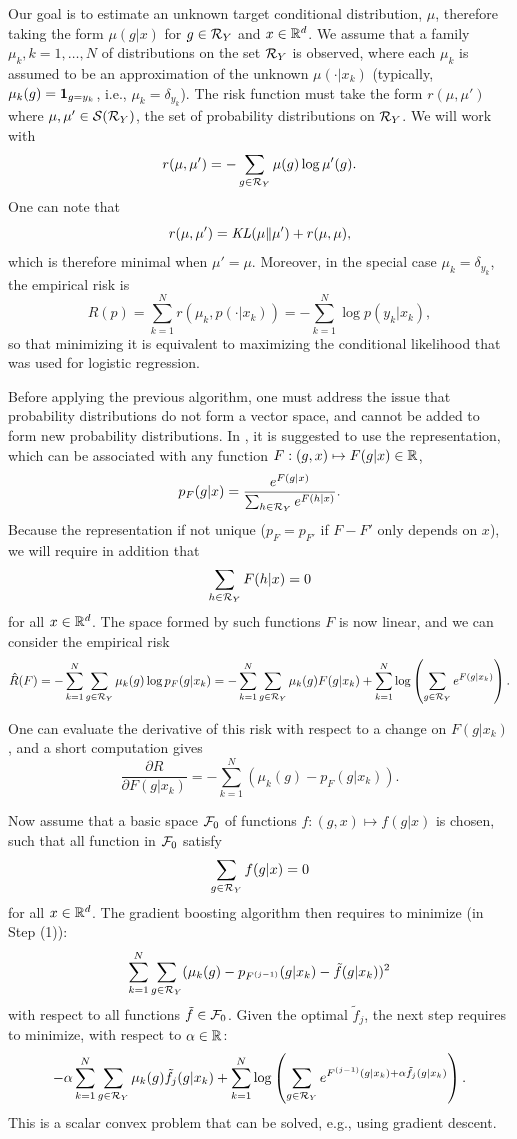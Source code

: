 Our goal is to estimate an unknown target conditional distribution, $\mu$, therefore taking the form $\mu(g|x)$ for $g\in {\mathcal R}_Y$ and $x\in{\mathbb{R}}^d$. We assume that a family $\mu_k, k=1, \ldots, N$ of distributions on the set ${\mathcal R}_Y$ is observed, where each $\mu_k$ is assumed to be an approximation of the unknown $\mu(\cdot|x_k)$ (typically, $\mu_k(g) = {\bm 1}_{g=y_k}$, i.e., $\mu_k = \delta_{y_k}$). The risk function must  take the form $r(\mu, \mu')$ where $\mu, \mu'\in {\mathcal S}({\mathcal R}_Y)$, the set of probability distributions on ${\mathcal R}_Y$. We will work with 
\[
r(\mu, \mu') = - \sum_{g\in{\mathcal R}_Y} \mu(g) \log\mu'(g).
\]
One can note that 
\[
r(\mu, \mu') = \mathit{KL}(\mu\|\mu') + r(\mu, \mu),
\]
which is therefore minimal when $\mu'=\mu$.
Moreover, in the special case $\mu_k = \delta_{y_k}$, the empirical risk is 
\[
\hat R(p) = \sum_{k=1}^N r(\mu_k, p(\cdot|x_k)) = - \sum_{k=1}^N \log p(y_k|x_k),
\]
so that minimizing it is equivalent to maximizing the conditional likelihood that was used for  logistic regression.

Before applying the previous algorithm, one must address the issue that probability distributions do not form a vector space, and cannot be added to form new probability distributions. In \citet{friedman2001greedy,htf03}, it is suggested to use the representation, which can be associated with any function $F: (g,x) \mapsto F(g|x)\in {\mathbb{R}}$,
\[
p_F(g|x) = \frac{e^{F(g|x)}}{\sum_{h\in{\mathcal R}_Y} e^{F(h|x)}}.
\]
Because the representation if not unique ($p_F = p_{F'}$ if $F-F'$ only depends on $x$), we will require in addition that
\[
\sum_{h\in{\mathcal R}_Y} F(h|x) = 0
\]
for all $x\in {\mathbb{R}}^d$. The space formed by such functions $F$ is now linear, and we can consider the empirical risk
\[
\hat R(F) = -\sum_{k=1}^N \sum_{g\in {\mathcal R}_Y} \mu_k(g)\log p_F(g|x_k) = -\sum_{k=1}^N \sum_{g\in {\mathcal R}_Y} \mu_k(g)F(g|x_k) + \sum_{k=1}^N \log\left(\sum_{g\in {\mathcal R}_Y}  e^{F(g|x_k)}\right).
\]

One can evaluate the derivative of this risk with respect to a change on $F(g|x_k)$, and a short computation gives
\[
\frac{\partial R}{\partial F(g|x_k)} = - \sum_{k=1}^N (\mu_k(g) - p_F(g|x_k)).
\]

\bigskip

Now assume that a basic space ${\mathcal F}_0$ of functions $f: (g,x) \mapsto f(g|x)$ is chosen, such that all function in ${\mathcal F}_0$ satisfy
\[
\sum_{g\in {\mathcal R}_Y} f(g|x) = 0
\]
for all $x\in {\mathbb{R}}^d$.
The gradient boosting algorithm then requires to minimize (in Step (1)):
\[
\sum_{k=1}^N \sum_{g\in {\mathcal R}_Y} (\mu_k(g) - p_{F^{(j-1)}}(g|x_k) - \tilde f(g|x_k))^2
\]
with respect to all functions $\tilde f \in {\mathcal F}_0$. Given the optimal $\tilde f_j$, the next step requires to minimize, with respect to $\alpha \in {\mathbb{R}}$:
\[
-\alpha \sum_{k=1}^N \sum_{g\in {\mathcal R}_Y} \mu_k(g)\tilde f_j(g|x_k) + \sum_{k=1}^N \log\left(\sum_{g\in {\mathcal R}_Y}  e^{F^{(j-1)}(g|x_k) + \alpha \tilde f_j(g|x_k)}\right).
\]
This is a scalar convex problem that can be solved, e.g., using gradient descent.

